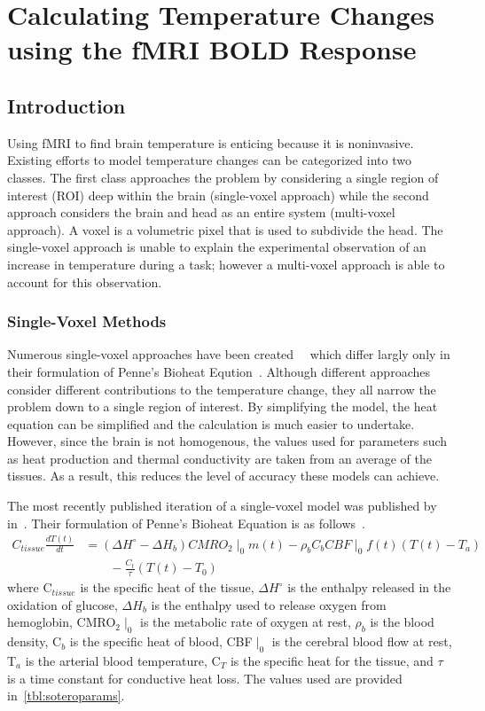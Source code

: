 \chapter{Calculating Temperature Changes using the fMRI BOLD Response}
  \section{\label{sec:tempmodelintro} Introduction}
  Using fMRI to find brain temperature is enticing because it is noninvasive.  Existing efforts to model temperature changes can be categorized into two classes.  The first class approaches the problem by considering a single region of interest (ROI) deep within the brain (single-voxel approach) while the second approach considers the brain and head as an entire system (multi-voxel approach). A voxel is a volumetric pixel that is used to subdivide the head.  The single-voxel approach is unable to explain the experimental observation of an increase in temperature during a task; however a multi-voxel approach is able to account for this observation.

    \subsection{\label{sec:singlevox} Single-Voxel Methods}
    Numerous single-voxel approaches have been created ~\citep{sotero2011,yablonskiy,trubel}~which differ largly only in their formulation of Penne's Bioheat Eqution~\citep{pennes}.  Although different approaches consider different contributions to the temperature change, they all narrow the problem down to a single region of interest.  By simplifying the model, the heat equation can be simplified and the calculation is much easier to undertake.  However, since the brain is not homogenous, the values used for parameters such as heat production and thermal conductivity are taken from an average of the tissues.  As a result, this reduces the level of accuracy these models can achieve.
    
    The most recently published iteration of a single-voxel model was published by~\citet{sotero2011} in~\citeyear{sotero2011}. Their formulation of Penne's Bioheat Equation is as follows~\citep{pennes, sotero2011}.
    \begin{align}
      \label{eq:bioheat}
      C_{tissue} \frac{dT(t)}{dt} &= (\Delta H^{\circ}-\Delta H_{b}) CMRO_{2}\mid_{0} m(t) - \rho_{b} C_{b} CBF\mid_{0} f(t) (T(t) - T_{a}) \nonumber \\
      &\qquad {} - \frac{C_{t}}{\tau} (T(t)-T_{0})
    \end{align}
    where C$_{tissue}$ is the specific heat of the tissue, $\Delta H^{\circ}$ is the enthalpy released in the oxidation of glucose, $\Delta H_b$ is the enthalpy used to release oxygen from hemoglobin, CMRO$_2 \mid_0$ is the metabolic rate of oxygen at rest, $\rho_b$ is the blood density, C$_b$ is the specific heat of blood, CBF$\mid_0$ is the cerebral blood flow at rest, T$_a$ is the arterial blood temperature, C$_T$ is the specific heat for the tissue, and $\tau$ is a time constant for conductive heat loss.  The values used are provided in~\cref{tbl:soteroparams}.
    
